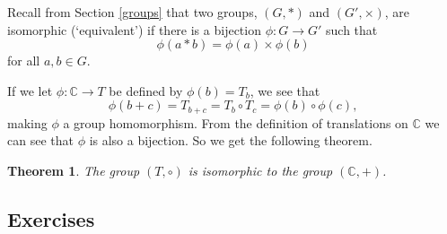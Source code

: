 \documentclass[
]{book}
\newtheorem{theorem}{Theorem}[chapter]
\theoremstyle{definition}
\theoremstyle{definition}
\theoremstyle{definition}
\theoremstyle{definition}
\theoremstyle{remark}
\begin{document}
Recall from Section \ref{groups} that two groups, \((G,*)\) and \((G',\times)\), are isomorphic (`equivalent') if there is a bijection \(\phi: G \rightarrow G'\) such that
\[\phi(a*b) = \phi(a)\times \phi(b)\]
for all \(a,b\in G\).

If we let \(\phi:\mathbb{C} \rightarrow T\) be defined by \(\phi(b)=T_b\), we see that \[\phi(b+c) = T_{b+c} = T_b \circ T_c = \phi(b) \circ \phi(c),\] making \(\phi\) a group homomorphism. From the definition of translations on \(\mathbb{C}\) we can see that \(\phi\) is also a bijection. So we get the following theorem.

\begin{theorem}
The group \((T,\circ)\) is isomorphic to the group \((\mathbb{C},+)\).
\end{theorem}

\hypertarget{exercises-52}{%
\subsection{Exercises}\label{exercises-52}}
\end{document}
